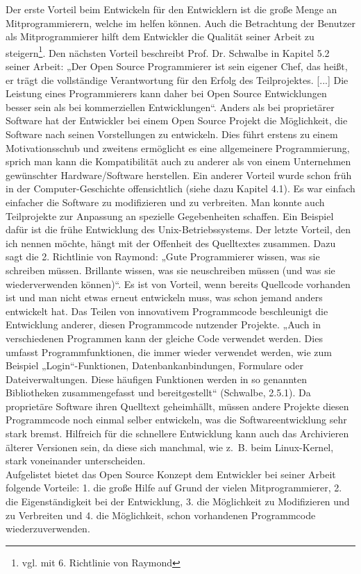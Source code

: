 \documentclass[a4paper,12pt]{article}
\begin{document}
Der erste Vorteil beim Entwickeln für den Entwicklern ist die große Menge an Mitprogrammierern, welche im helfen können. Auch die Betrachtung der Benutzer als Mitprogrammierer hilft dem Entwickler die Qualität seiner Arbeit zu steigern\footnote{vgl. mit 6. Richtlinie von Raymond}. Den nächsten Vorteil beschreibt Prof. Dr. Schwalbe in Kapitel 5.2 seiner Arbeit: „Der Open Source Programmierer ist sein eigener Chef, das heißt, er trägt die vollständige Verantwortung für den Erfolg des Teilprojektes. [...] Die Leistung eines Programmierers kann daher bei Open Source Entwicklungen besser sein als bei kommerziellen Entwicklungen“. Anders als bei proprietärer Software hat der Entwickler bei einem Open Source Projekt die Möglichkeit, die Software nach seinen Vorstellungen zu entwickeln. Dies führt erstens zu einem Motivationsschub und zweitens ermöglicht es eine allgemeinere Programmierung, sprich man kann die Kompatibilität auch zu anderer als von einem Unternehmen gewünschter Hardware/Software herstellen. Ein anderer Vorteil wurde schon früh in der Computer-Geschichte offensichtlich (siehe dazu Kapitel 4.1). Es war einfach einfacher die Software zu modifizieren und zu verbreiten. Man konnte auch Teilprojekte zur Anpassung an spezielle Gegebenheiten schaffen. Ein Beispiel dafür ist die frühe Entwicklung des Unix-Betriebssystems. Der letzte Vorteil, den ich nennen möchte, hängt mit der Offenheit des Quelltextes zusammen. Dazu sagt die 2. Richtlinie von Raymond: „Gute Programmierer wissen, was sie schreiben müssen. Brillante wissen, was sie neuschreiben müssen (und was sie wiederverwenden können)“. Es ist von Vorteil, wenn bereits Quellcode vorhanden ist und man nicht etwas erneut entwickeln muss, was schon jemand anders entwickelt hat. Das Teilen von innovativem Programmcode beschleunigt die Entwicklung anderer, diesen Programmcode nutzender Projekte. „Auch in verschiedenen Programmen kann der gleiche Code verwendet werden. Dies umfasst Programmfunktionen, die immer wieder verwendet werden, wie zum Beispiel „Login“-Funktionen, Datenbankanbindungen, Formulare oder Dateiverwaltungen. Diese häufigen Funktionen werden in so genannten Bibliotheken zusammengefasst und bereitgestellt“ (Schwalbe, 2.5.1). Da proprietäre Software ihren Quelltext geheimhällt, müssen andere Projekte diesen Programmcode noch einmal selber entwickeln, was die Softwareentwicklung sehr stark bremst. Hilfreich für die schnellere Entwicklung kann auch das Archivieren älterer Versionen sein, da diese sich manchmal, wie z.~B. beim Linux-Kernel, stark voneinander unterscheiden.\\
Aufgelistet bietet das Open Source Konzept dem Entwickler bei seiner Arbeit folgende Vorteile: 1. die große Hilfe auf Grund der vielen Mitprogrammierer, 2. die Eigenständigkeit bei der Entwicklung, 3. die Möglichkeit zu Modifizieren und zu Verbreiten und 4. die Möglichkeit, schon vorhandenen Programmcode wiederzuverwenden.
\end{document}
